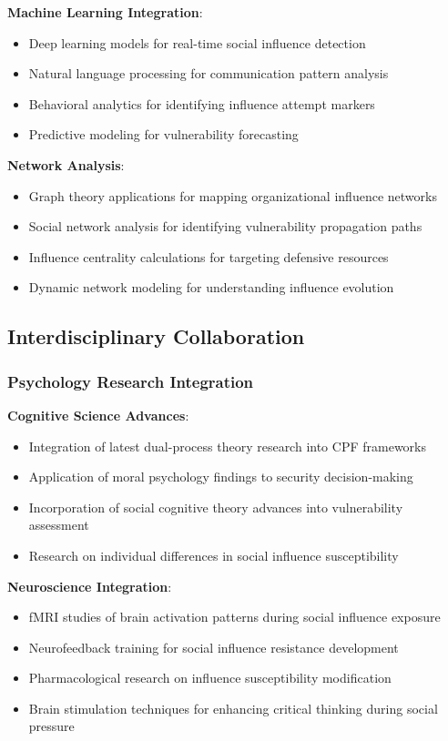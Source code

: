 \documentclass[11pt,a4paper]{article}
\begin{document}
\textbf{Machine Learning Integration}:
\begin{itemize}
\item Deep learning models for real-time social influence detection
\item Natural language processing for communication pattern analysis
\item Behavioral analytics for identifying influence attempt markers
\item Predictive modeling for vulnerability forecasting
\end{itemize}

\textbf{Network Analysis}:
\begin{itemize}
\item Graph theory applications for mapping organizational influence networks
\item Social network analysis for identifying vulnerability propagation paths
\item Influence centrality calculations for targeting defensive resources
\item Dynamic network modeling for understanding influence evolution
\end{itemize}

\subsection{Interdisciplinary Collaboration}

\subsubsection{Psychology Research Integration}

\textbf{Cognitive Science Advances}:
\begin{itemize}
\item Integration of latest dual-process theory research into CPF frameworks
\item Application of moral psychology findings to security decision-making
\item Incorporation of social cognitive theory advances into vulnerability assessment
\item Research on individual differences in social influence susceptibility
\end{itemize}

\textbf{Neuroscience Integration}:
\begin{itemize}
\item fMRI studies of brain activation patterns during social influence exposure
\item Neurofeedback training for social influence resistance development
\item Pharmacological research on influence susceptibility modification
\item Brain stimulation techniques for enhancing critical thinking during social pressure
\end{itemize}
\end{document}
